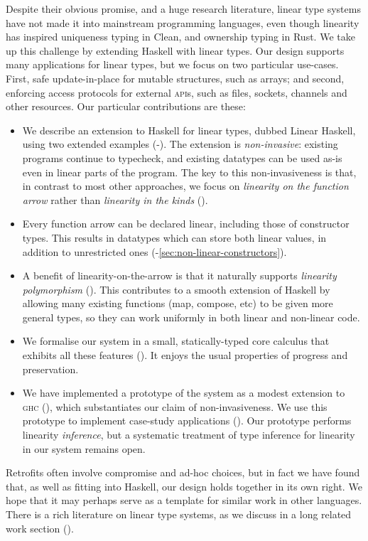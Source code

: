 \documentclass[acmsmall,screen]{acmart}\settopmatter{}
\newcommand\HaskeLL{Linear Haskell\xspace{}}
\begin{document}
Despite their obvious promise, and a huge research literature, linear
type systems have not made it into mainstream programming languages,
even though linearity has inspired uniqueness typing in Clean, and
ownership typing in Rust.  We take up this challenge by extending
Haskell with linear types.
%
Our design supports many applications for linear types, but we focus on
two particular use-cases.  First, safe
update-in-place for mutable structures, such as arrays; and second,
enforcing access protocols for external \textsc{api}s, such as files,
sockets, channels and other resources.  Our particular contributions
are these:
\begin{itemize}
\item We describe an extension to Haskell for linear types, dubbed \HaskeLL, using
      two extended examples (-).
      The extension is \emph{non-invasive}:
      existing programs continue to typecheck,
      and existing datatypes can be used as-is even in linear parts
      of the program.
      The key to this non-invasiveness is that, in contrast to most other
      approaches, we focus on \emph{linearity on the function arrow}
      rather than \emph{linearity in the kinds} ().
\item Every function arrow can be declared linear, including those of
      constructor types. This results in datatypes which can store
      both linear values, in addition to unrestricted ones
      (-\ref{sec:non-linear-constructors}).
\item A benefit of linearity-on-the-arrow is that it naturally supports
      \emph{linearity polymorphism} ().  This contributes
      to a smooth extension of Haskell by allowing many existing functions
      (map, compose, etc) to be given more general types, so they can
      work uniformly in both linear and non-linear code.
\item We formalise our system in a small, statically-typed core
      calculus that exhibits all these features ().
      It enjoys the usual properties of progress and preservation.
\item We have implemented a prototype of the system as a modest extension to \textsc{ghc}
      (), which substantiates our claim of non-invasiveness.
      We use this prototype to implement case-study applications ().
      Our prototype performs linearity \emph{inference}, but a systematic
      treatment of type inference for linearity in our system remains open.
\end{itemize}
Retrofits often involve compromise and ad-hoc choices, but in fact we
have found that, as well as fitting into Haskell, our design holds
together in its own right.  We hope that it may perhaps serve as a
template for similar work in other languages.  There is a rich
literature on linear type systems, as we discuss in a long related
work section ().
\end{document}
